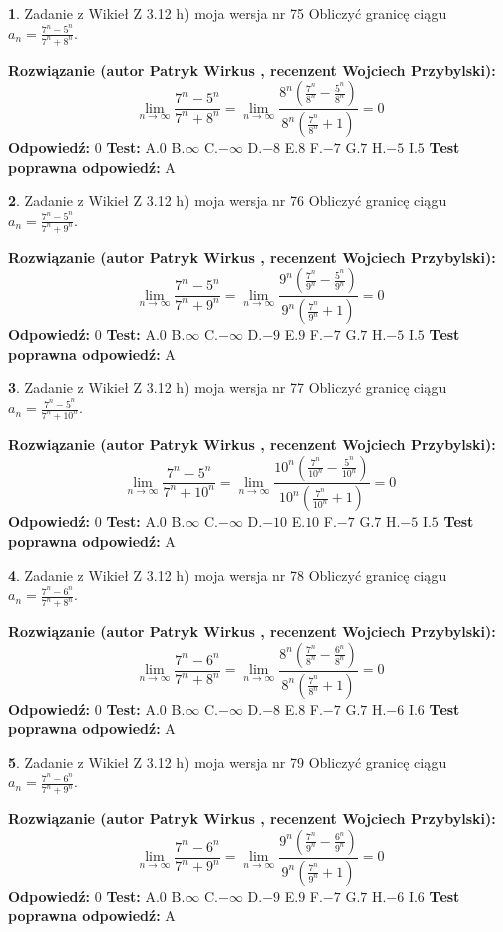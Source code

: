 \documentclass[12pt, a4paper]{article}
\theoremstyle{definition} %
\newtheorem{zad}{}
\newcommand{\zadStart}[1]{\begin{zad}#1\newline}
\newcommand{\zadStop}{\end{zad}}
\newcommand{\rozwStart}[2]{\noindent \textbf{Rozwiązanie (autor #1 , recenzent #2): }\newline}
\newcommand{\rozwStop}{\newline}
\newcommand{\odpStart}{\noindent \textbf{Odpowiedź:}\newline}
\newcommand{\odpStop}{\newline}
\newcommand{\testStart}{\noindent \textbf{Test:}\newline}
\newcommand{\testStop}{\newline}
\newcommand{\kluczStart}{\noindent \textbf{Test poprawna odpowiedź:}\newline}
\newcommand{\kluczStop}{\newline}
\begin{document}
\zadStart{Zadanie z Wikieł Z 3.12 h) moja wersja nr 75}
Obliczyć granicę ciągu $a_{n}=\frac{7^{n} - 5^{n}}{7^{n} + 8^{n}}$.
\zadStop
\rozwStart{Patryk Wirkus}{Wojciech Przybylski}
$$\lim\limits_{n\to\infty}\frac{7^{n} - 5^{n}}{7^{n} + 8^{n}} = \lim\limits_{n\to\infty}\frac{8^{n}(\frac{7^{n}}{8^{n}} - \frac{5^{n}}{8^{n}})}{8^{n}(\frac{7^{n}}{8^{n}} + 1)} = 0$$
\rozwStop
\odpStart
$0$
\odpStop
\testStart
A.$0$
B.$\infty$
C.$-\infty$
D.$-8$
E.$8$
F.$-7$
G.$7$
H.$-5$
I.$5$
\testStop
\kluczStart
A
\kluczStop



\zadStart{Zadanie z Wikieł Z 3.12 h) moja wersja nr 76}
Obliczyć granicę ciągu $a_{n}=\frac{7^{n} - 5^{n}}{7^{n} + 9^{n}}$.
\zadStop
\rozwStart{Patryk Wirkus}{Wojciech Przybylski}
$$\lim\limits_{n\to\infty}\frac{7^{n} - 5^{n}}{7^{n} + 9^{n}} = \lim\limits_{n\to\infty}\frac{9^{n}(\frac{7^{n}}{9^{n}} - \frac{5^{n}}{9^{n}})}{9^{n}(\frac{7^{n}}{9^{n}} + 1)} = 0$$
\rozwStop
\odpStart
$0$
\odpStop
\testStart
A.$0$
B.$\infty$
C.$-\infty$
D.$-9$
E.$9$
F.$-7$
G.$7$
H.$-5$
I.$5$
\testStop
\kluczStart
A
\kluczStop



\zadStart{Zadanie z Wikieł Z 3.12 h) moja wersja nr 77}
Obliczyć granicę ciągu $a_{n}=\frac{7^{n} - 5^{n}}{7^{n} + 10^{n}}$.
\zadStop
\rozwStart{Patryk Wirkus}{Wojciech Przybylski}
$$\lim\limits_{n\to\infty}\frac{7^{n} - 5^{n}}{7^{n} + 10^{n}} = \lim\limits_{n\to\infty}\frac{10^{n}(\frac{7^{n}}{10^{n}} - \frac{5^{n}}{10^{n}})}{10^{n}(\frac{7^{n}}{10^{n}} + 1)} = 0$$
\rozwStop
\odpStart
$0$
\odpStop
\testStart
A.$0$
B.$\infty$
C.$-\infty$
D.$-10$
E.$10$
F.$-7$
G.$7$
H.$-5$
I.$5$
\testStop
\kluczStart
A
\kluczStop



\zadStart{Zadanie z Wikieł Z 3.12 h) moja wersja nr 78}
Obliczyć granicę ciągu $a_{n}=\frac{7^{n} - 6^{n}}{7^{n} + 8^{n}}$.
\zadStop
\rozwStart{Patryk Wirkus}{Wojciech Przybylski}
$$\lim\limits_{n\to\infty}\frac{7^{n} - 6^{n}}{7^{n} + 8^{n}} = \lim\limits_{n\to\infty}\frac{8^{n}(\frac{7^{n}}{8^{n}} - \frac{6^{n}}{8^{n}})}{8^{n}(\frac{7^{n}}{8^{n}} + 1)} = 0$$
\rozwStop
\odpStart
$0$
\odpStop
\testStart
A.$0$
B.$\infty$
C.$-\infty$
D.$-8$
E.$8$
F.$-7$
G.$7$
H.$-6$
I.$6$
\testStop
\kluczStart
A
\kluczStop



\zadStart{Zadanie z Wikieł Z 3.12 h) moja wersja nr 79}
Obliczyć granicę ciągu $a_{n}=\frac{7^{n} - 6^{n}}{7^{n} + 9^{n}}$.
\zadStop
\rozwStart{Patryk Wirkus}{Wojciech Przybylski}
$$\lim\limits_{n\to\infty}\frac{7^{n} - 6^{n}}{7^{n} + 9^{n}} = \lim\limits_{n\to\infty}\frac{9^{n}(\frac{7^{n}}{9^{n}} - \frac{6^{n}}{9^{n}})}{9^{n}(\frac{7^{n}}{9^{n}} + 1)} = 0$$
\rozwStop
\odpStart
$0$
\odpStop
\testStart
A.$0$
B.$\infty$
C.$-\infty$
D.$-9$
E.$9$
F.$-7$
G.$7$
H.$-6$
I.$6$
\testStop
\kluczStart
A
\kluczStop
\end{document}
